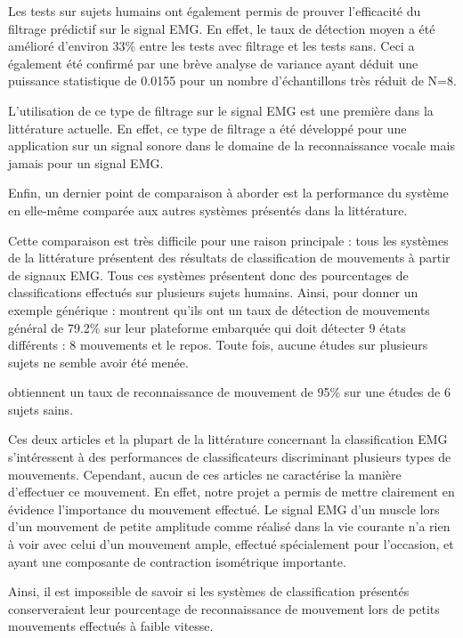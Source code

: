 \documentclass[letterpaper, twoside, 12pt, memoire, creativecommons, hyperref]{thETS}
\begin{document}
Les tests sur sujets humains ont également permis de prouver l'efficacité du filtrage prédictif sur le signal EMG. En effet, le taux de détection moyen a été amélioré d'environ 33\% entre les tests avec filtrage et les tests sans. Ceci a également été confirmé par une brève analyse de variance ayant déduit une puissance statistique de 0.0155 pour un nombre d'échantillons très réduit de N=8.

L'utilisation de ce type de filtrage sur le signal EMG est une première dans la littérature actuelle. En effet, ce type de filtrage a été développé pour une application sur un signal sonore dans le domaine de la reconnaissance vocale mais jamais pour un signal EMG.

Enfin, un dernier point de comparaison à aborder est la performance du système en elle-même comparée aux autres systèmes présentés dans la littérature. 

Cette comparaison est très difficile pour une raison principale : tous les systèmes de la littérature présentent des résultats de classification de mouvements à partir de signaux EMG. Tous ces systèmes présentent donc des pourcentages de classifications effectués sur plusieurs sujets humains. Ainsi, pour donner un exemple générique : \cite{Tenore2007} montrent qu'ils ont un taux de détection de mouvements général de 79.2\% sur leur plateforme embarquée qui doit détecter 9 états différents : 8 mouvements et le repos. Toute fois, aucune études sur plusieurs sujets ne semble avoir été menée. 

\cite{Chang1996} obtiennent un taux de reconnaissance de mouvement de 95\% sur une études de 6 sujets sains.

Ces deux articles et la plupart de la littérature concernant la classification EMG s'intéressent à des performances de classificateurs discriminant plusieurs types de mouvements. Cependant, aucun de ces articles ne caractérise la manière d'effectuer ce mouvement. En effet, notre projet a permis de mettre clairement en évidence l'importance du mouvement effectué. Le signal EMG d'un muscle lors d'un mouvement de petite amplitude comme réalisé dans la vie courante n'a rien à voir avec celui d'un mouvement ample, effectué spécialement pour l'occasion, et ayant une composante de contraction isométrique importante. 

Ainsi, il est impossible de savoir si les systèmes de classification présentés conserveraient leur pourcentage de reconnaissance de mouvement lors de petits mouvements effectués à faible vitesse.
\end{document}
